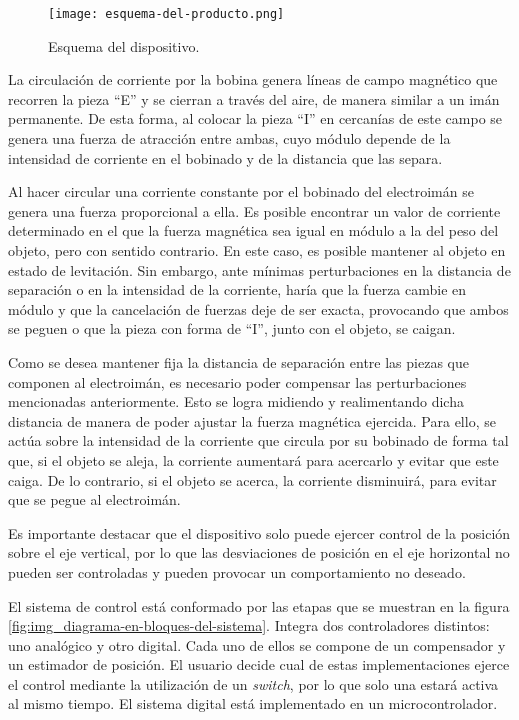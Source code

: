 \begin{figure}[H]
	\centering
	\texttt{[image: esquema-del-producto.png]}
	\caption{Esquema del dispositivo.}
	\label{fig:img_Esquema-del-producto}
\end{figure}

La circulación de corriente por la bobina genera líneas de campo magnético que recorren la pieza “E” y se cierran a través del aire, de manera similar a un imán permanente. De esta forma, al colocar la pieza “I” en cercanías de este campo se genera una fuerza de atracción entre ambas, cuyo módulo depende de la intensidad de corriente en el bobinado y de la distancia que las separa.

Al hacer circular una corriente constante por el bobinado del electroimán se genera una fuerza proporcional a ella. Es posible encontrar un valor de corriente determinado en el que la fuerza magnética sea igual en módulo a la del peso del objeto, pero con sentido contrario. En este caso, es posible mantener al objeto en estado de levitación. Sin embargo, ante mínimas perturbaciones en la distancia de separación o en la intensidad de la corriente, haría que la fuerza cambie en módulo y que la cancelación de fuerzas deje de ser exacta, provocando que ambos se peguen o que la pieza con forma de “I”, junto con el objeto, se caigan. 

Como se desea mantener fija la distancia de separación entre las piezas que componen al electroimán, es necesario poder compensar las perturbaciones mencionadas anteriormente.   Esto se logra midiendo y realimentando dicha distancia de manera de poder ajustar la fuerza magnética ejercida. Para ello, se actúa sobre la intensidad de la corriente que circula por su bobinado de forma tal que, si el objeto se aleja, la corriente aumentará para acercarlo y evitar que este caiga. De lo contrario, si el objeto se acerca, la corriente disminuirá, para evitar que se pegue al electroimán. 

Es importante destacar que el dispositivo solo puede ejercer control de la posición sobre el eje vertical, por lo que las desviaciones de posición en el eje horizontal no pueden ser controladas y pueden provocar un comportamiento no deseado.

El sistema de control está conformado por las etapas que se muestran en la figura \ref{fig:img_diagrama-en-bloques-del-sistema}. Integra dos controladores distintos: uno analógico y otro digital. Cada uno de ellos se compone de un compensador y un estimador de posición. El usuario decide cual de estas implementaciones ejerce el control mediante la utilización de un \textsl{switch}, por lo que solo una estará activa al mismo tiempo. El sistema digital está implementado en un microcontrolador.

